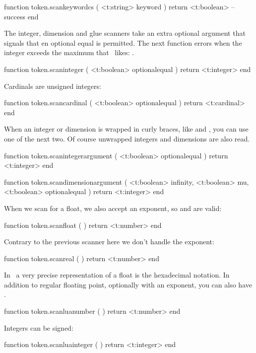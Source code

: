 function token.scankeywordcs ( <t:string> keyword )
    return <t:boolean> -- success
end
\stoptyping

The integer, dimension and glue scanners take an extra optional argument that
signals that en optional equal is permitted. The next function errors when
the integer exceeds the maximum that \TEX\ likes: \number \maxcount .

\starttyping[option=LUA]
function token.scaninteger ( <t:boolean> optionalequal )
    return <t:integer>
end
\stoptyping

Cardinals are unsigned integers:

\starttyping[option=LUA]
function token.scancardinal ( <t:boolean> optionalequal )
    return <t:cardinal>
end
\stoptyping

When an integer or dimension is wrapped in curly braces, like  and
\type {{4.5pt}}, you can use one of the next two. Of course unwrapped integers
and dimensions are also read.

\starttyping[option=LUA]
function token.scanintegerargument ( <t:boolean> optionalequal )
    return <t:integer>
end

function token.scandimensionargument (
    <t:boolean> infinity,
    <t:boolean> mu,
    <t:boolean> optionalequal
)
    return <t:integer>
end
\stoptyping

When we scan for a float, we also accept an exponent, so  and
 are valid:


\starttyping[option=LUA]
function token.scanfloat ( )
    return <t:number>
end
\stoptyping

Contrary to the previous scanner here we don't handle the exponent:

\starttyping[option=LUA]
function token.scanreal ( )
    return <t:number>
end
\stoptyping

In \LUA\ a very precise representation of a float is the hexadecimal notation. In
addition to regular floating point, optionally with an exponent, you can also
have .


\starttyping[option=LUA]
function token.scanluanumber ( )
    return <t:number>
end
\stoptyping

Integers can be signed:

\starttyping[option=LUA]
function token.scanluainteger ( )
    return <t:integer>
end
\stoptyping

